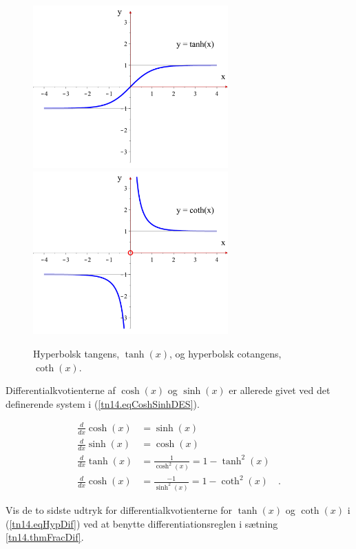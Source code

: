 \begin{figure}[h]
\centerline{\includegraphics[width=75mm]{FIGS/plottanh.pdf} \quad \quad \includegraphics[width=75mm]{FIGS/plotcoth.pdf}}
\begin{center}
\caption{Hyperbolsk tangens, $\tanh(x)$, og hyperbolsk cotangens, $\coth(x)$.} \label{tn14.figplotTanhCoth}
\end{center}
\end{figure}




Differentialkvotienterne af $\cosh(x)$ og $\sinh(x)$ er allerede givet ved det definerende
system i (\ref{tn14.eqCoshSinhDES}).

\begin{equation} \label{tn14.eqHypDif}
\begin{aligned}
\frac{d}{dx}\cosh(x) &= \sinh(x) \\
\frac{d}{dx}\sinh(x) &= \cosh(x) \\
\frac{d}{dx}\tanh(x) &= \frac{1}{\cosh^{2}(x)} = 1 - \tanh^{2}(x) \\
\frac{d}{dx}\cosh(x) &= \frac{-1}{\sinh^{2}(x)} = 1 - \coth^{2}(x) \quad .
\end{aligned}
\end{equation}

\begin{exercise}
Vis de to sidste udtryk for differentialkvotienterne for $\tanh(x)$ og $\coth(x)$ i (\ref{tn14.eqHypDif}) ved at benytte differentiationsreglen i sætning \ref{tn14.thmFracDif}.
\end{exercise}

